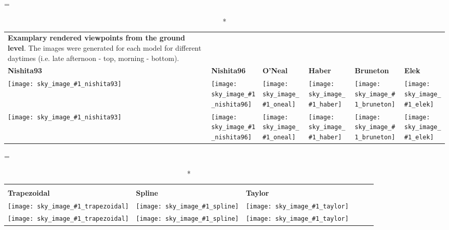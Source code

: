 \def \myuserstudyimgwidth {0.45}

\newcommand{\userstudyrow}[1]{
\texttt{[image: sky\_image\_\#1\_nishita93]}&
\texttt{[image: sky\_image\_\#1\_nishita96]}&
\texttt{[image: sky\_image\_\#1\_oneal]}&
\texttt{[image: sky\_image\_\#1\_haber]}&
\texttt{[image: sky\_image\_\#1\_bruneton]}&
\texttt{[image: sky\_image\_\#1\_elek]}
}

\newcommand{\userstudy}{
\setlength{\tabcolsep}{0cm}
\renewcommand\arraystretch{0}
\LTcapwidth=\textwidth
\begin{longtable}{*{6}{p{\myuserstudyimgwidth\mytablewidth}}}
\caption*{{\bf Examplary rendered viewpoints from the ground level}. The images were generated for each model for different daytimes (i.e. late afternoon - top, morning - bottom).\label{fig:userstudy}}\\

\footnotesize\bfseries Nishita93 &
\footnotesize\bfseries Nishita96 &
\footnotesize\bfseries O'Neal &
\footnotesize\bfseries Haber &
\footnotesize\bfseries Bruneton &
\footnotesize\bfseries Elek 
\vspace{1mm} \\ 
\userstudyrow{sunrise}\\
\userstudyrow{morning}
\end{longtable}
}


\newcommand{\userstudyroww}[1]{
	\texttt{[image: sky\_image\_\#1\_trapezoidal]}&
	\texttt{[image: sky\_image\_\#1\_spline]} &
	\texttt{[image: sky\_image\_\#1\_taylor]} 
}

\newcommand{\userstudyy}{
	\setlength{\tabcolsep}{0cm}
	\renewcommand\arraystretch{0}
	\LTcapwidth=\textwidth
	\begin{longtable}{*{6}{p{\myuserstudyimgwidth\mytablewidth}}}
		\caption*{}\\
		\footnotesize\bfseries Trapezoidal &
		\footnotesize\bfseries Spline &
		\footnotesize\bfseries Taylor
		\vspace{1mm} \\ 
		\userstudyroww{sunrise}\\
		\userstudyroww{morning}
	\end{longtable}
}

\begin{landscape}
	\parbox[c][\textwidth][s]{\linewidth}{%
		
		\userstudy
		\userstudyy
		
		\vfill}
\end{landscape}

